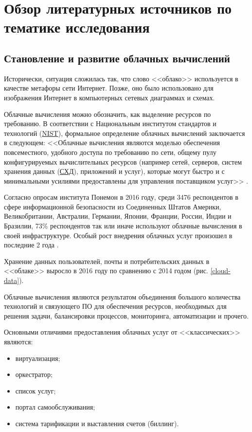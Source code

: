 \section{Обзор литературных источников по тематике исследования}

\subsection{Становление и развитие облачных вычислений}

Исторически, ситуация сложилась так, что слово <<облако>> используется в качестве метафоры сети Интернет.
Позже, оно было использовано для изображения Интернет в компьютерных сетевых диаграммах и схемах.

Облачные вычисления можно обозначить, как выделение ресурсов по требованию.
В соответствии с Национальным институтом стандартов и технологий (\hyperlink{nist}{NIST}), формальное определение облачных вычислений заключается в следующем:
<<Облачные вычисления являются моделью обеспечения повсеместного, удобного доступа по требованию по сети, общему пулу конфигурируемых вычислительных ресурсов (например сетей, серверов, систем хранения данных (\hyperlink{storage}{СХД}), приложений и услуг), которые могут быстро и с минимальными усилиями предоставлены для управления поставщиком услуг>> \cite{nist}.

Согласно опросам института Понемон в 2016 году, среди 3476 респондентов в сфере информационной безопасности из Соединенных Штатов Америки, Великобритании, Австралии, Германии, Японии, Франции, России, Индии и Бразилии, 73\% респондентов так или иначе используют облачные вычисления в своей инфраструктуре.
Особый рост внедрения облачных услуг произошел в последние 2 года \cite{gemalto}.

Хранение данных пользователей, почты и потребительских данных в <<облаке>> выросло в 2016 году по сравнению с 2014 годом (рис. \ref{cloud-data}).


Облачные вычисления являются результатом объединения большого количества технологий и связующего ПО для обеспечения ресурсов, необходимых для решения задачи, балансировки процессов, мониторинга, автоматизации и прочего.

Основными отличиями предоставления облачных услуг от <<классических>> являются:
\begin{itemize}
  \item виртуализация;
  \item оркестратор;
  \item список услуг;
  \item портал самообслуживания;
  \item система тарификации и выставления счетов (биллинг).
\end{itemize}

